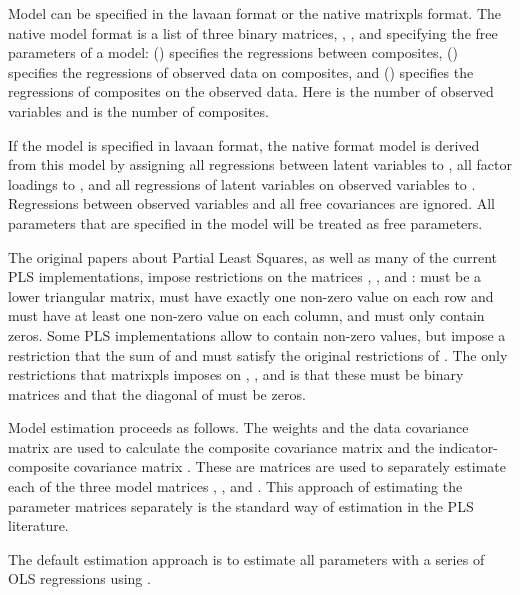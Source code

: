 \documentclass[a4paper]{book}
\begin{document}
\begin{Details}\relax
Model can be specified in the lavaan format or the native matrixpls format.
The native model format is a list of three binary matrices, , ,
and  specifying the free parameters of a model:  () specifies the 
regressions between composites,  () specifies the regressions of observed
data on composites, and  () specifies the regressions of composites on the
observed data. Here  is the number of observed variables and  is the number of composites.

If the model is specified in lavaan format, the native
format model is derived from this model by assigning all regressions between latent
variables to , all factor loadings to , and all regressions
of latent variables on observed variables to . Regressions between
observed variables and all free covariances are ignored. All parameters that are
specified in the model will be treated as free parameters.

The original papers about Partial Least Squares, as well as many of the current PLS
implementations, impose restrictions on the matrices ,
, and :  must be a lower triangular matrix,
 must have exactly one non-zero value on each row and must have at least
one non-zero value on each column, and  must only contain zeros.
Some PLS implementations allow  to contain non-zero values, but impose a
restriction that the sum of  and  must satisfy
the original restrictions of . The only restrictions that matrixpls
imposes on , , and  is that these must be
binary matrices and that the diagonal of  must be zeros.

Model estimation proceeds as follows. The weights  and the
data covariance matrix  are used to calculate the composite covariance matrix 
and the indicator-composite covariance matrix . These are matrices are used to
separately estimate each of the three model matrices , , and
. This approach of estimating the parameter matrices separately is the
standard way of estimation in the PLS literature.

The default estimation approach is to estimate all parameters with a series of OLS 
regressions using .
\end{Details}
\end{document}
